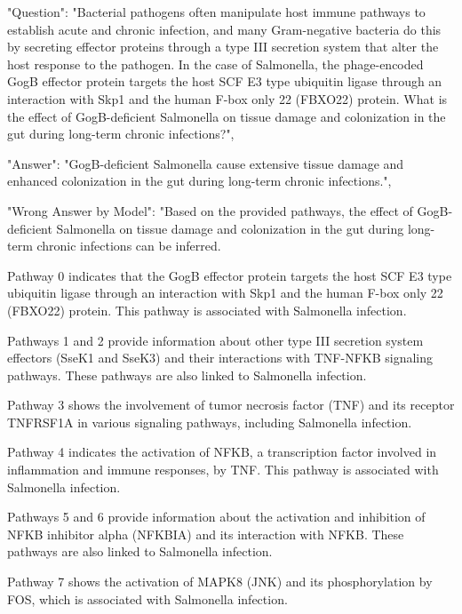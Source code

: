 \begin{tcolorbox}[breakable]
"Question": "Bacterial pathogens often manipulate host immune pathways to establish acute and chronic infection, and many Gram-negative bacteria do this by secreting effector proteins through a type III secretion system that alter the host response to the pathogen. In the case of Salmonella, the phage-encoded GogB effector protein targets the host SCF E3 type ubiquitin ligase through an interaction with Skp1 and the human F-box only 22 (FBXO22) protein. What is the effect of GogB-deficient Salmonella on tissue damage and colonization in the gut during long-term chronic infections?",

"Answer": "GogB-deficient Salmonella cause extensive tissue damage and enhanced colonization in the gut during long-term chronic infections.",



"Wrong Answer by Model": "Based on the provided pathways, the effect of GogB-deficient Salmonella on tissue damage and colonization in the gut during long-term chronic infections can be inferred. 

Pathway 0 indicates that the GogB effector protein targets the host SCF E3 type ubiquitin ligase through an interaction with Skp1 and the human F-box only 22 (FBXO22) protein. This pathway is associated with Salmonella infection.

Pathways 1 and 2 provide information about other type III secretion system effectors (SseK1 and SseK3) and their interactions with TNF-NFKB signaling pathways. These pathways are also linked to Salmonella infection.

Pathway 3 shows the involvement of tumor necrosis factor (TNF) and its receptor TNFRSF1A in various signaling pathways, including Salmonella infection.

Pathway 4 indicates the activation of NFKB, a transcription factor involved in inflammation and immune responses, by TNF. This pathway is associated with Salmonella infection.

Pathways 5 and 6 provide information about the activation and inhibition of NFKB inhibitor alpha (NFKBIA) and its interaction with NFKB. These pathways are also linked to Salmonella infection.

Pathway 7 shows the activation of MAPK8 (JNK) and its phosphorylation by FOS, which is associated with Salmonella infection.


\end{tcolorbox}
